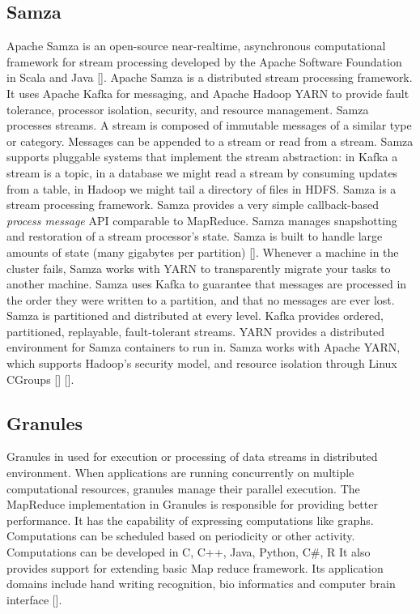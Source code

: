     
\subsection{Samza}

Apache Samza is an open-source near-realtime, asynchronous
computational framework for stream processing developed by the Apache
Software Foundation in Scala and Java [\cite{www-samza-3}].  Apache
Samza is a distributed stream processing framework. It uses Apache
Kafka for messaging, and Apache Hadoop YARN to provide fault
tolerance, processor isolation, security, and resource
management. Samza processes streams. A stream is composed of immutable
messages of a similar type or category. Messages can be appended to a
stream or read from a stream.  Samza supports pluggable systems that
implement the stream abstraction: in Kafka a stream is a topic, in a
database we might read a stream by consuming updates from a table, in
Hadoop we might tail a directory of files in HDFS. Samza is a stream
processing framework. Samza provides a very simple callback-based
\textit{process message} API comparable to MapReduce.  Samza manages
snapshotting and restoration of a stream processor's state.  Samza is
built to handle large amounts of state (many gigabytes per
partition) [\cite{www-samza-1}].  Whenever a machine in the cluster
fails, Samza works with YARN to transparently migrate your tasks to
another machine. Samza uses Kafka to guarantee that messages are
processed in the order they were written to a partition, and that no
messages are ever lost.  Samza is partitioned and distributed at every
level. Kafka provides ordered, partitioned, replayable, fault-tolerant
streams. YARN provides a distributed environment for Samza containers
to run in. Samza works with Apache YARN, which supports Hadoop's
security model, and resource isolation through Linux
CGroups [\cite{www-samza-4}] [\cite{www-samza-3}].

\subsection{Granules}

Granules in used for execution or processing of data streams in
distributed environment.  When applications are running concurrently
on multiple computational resources, granules manage their parallel
execution.  The MapReduce implementation in Granules is responsible
for providing better performance. It has the capability of expressing
computations like graphs.  Computations can be scheduled based on
periodicity or other activity.  Computations can be developed in C,
C++, Java, Python, C\#, R It also provides support for extending basic
Map reduce framework.  Its application domains include hand writing
recognition, bio informatics and computer brain
interface [\cite{www-granules}].

